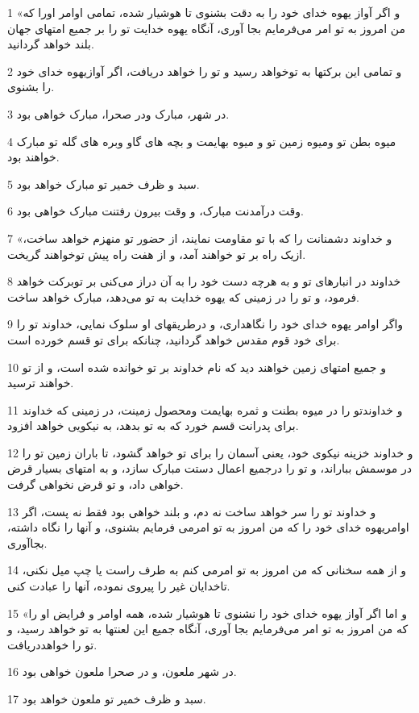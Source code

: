 \par 1 «و اگر آواز یهوه خدای خود را به دقت بشنوی تا هوشیار شده، تمامی اوامر اورا که من امروز به تو امر می‌فرمایم بجا آوری، آنگاه یهوه خدایت تو را بر جمیع امتهای جهان بلند خواهد گردانید.
\par 2 و تمامی این برکتها به توخواهد رسید و تو را خواهد دریافت، اگر آوازیهوه خدای خود را بشنوی.
\par 3 در شهر، مبارک ودر صحرا، مبارک خواهی بود.
\par 4 میوه بطن تو ومیوه زمین تو و میوه بهایمت و بچه های گاو وبره های گله تو مبارک خواهند بود.
\par 5 سبد و ظرف خمیر تو مبارک خواهد بود.
\par 6 وقت درآمدنت مبارک، و وقت بیرون رفتنت مبارک خواهی بود.
\par 7 «و خداوند دشمنانت را که با تو مقاومت نمایند، از حضور تو منهزم خواهد ساخت، ازیک راه بر تو خواهند آمد، و از هفت راه پیش توخواهند گریخت.
\par 8 خداوند در انبارهای تو و به هر‌چه دست خود را به آن دراز می‌کنی بر توبرکت خواهد فرمود، و تو را در زمینی که یهوه خدایت به تو می‌دهد، مبارک خواهد ساخت.
\par 9 واگر اوامر یهوه خدای خود را نگاهداری، و درطریقهای او سلوک نمایی، خداوند تو را برای خود قوم مقدس خواهد گردانید، چنانکه برای تو قسم خورده است.
\par 10 و جمیع امتهای زمین خواهند دید که نام خداوند بر تو خوانده شده است، و از تو خواهند ترسید.
\par 11 و خداوندتو را در میوه بطنت و ثمره بهایمت ومحصول زمینت، در زمینی که خداوند برای پدرانت قسم خورد که به تو بدهد، به نیکویی خواهد افزود.
\par 12 و خداوند خزینه نیکوی خود، یعنی آسمان را برای تو خواهد گشود، تا باران زمین تو را در موسمش بباراند، و تو را درجمیع اعمال دستت مبارک سازد، و به امتهای بسیار قرض خواهی داد، و تو قرض نخواهی گرفت.
\par 13 و خداوند تو را سر خواهد ساخت نه دم، و بلند خواهی بود فقط نه پست، اگر اوامریهوه خدای خود را که من امروز به تو امرمی فرمایم بشنوی، و آنها را نگاه داشته، بجاآوری.
\par 14 و از همه سخنانی که من امروز به تو امرمی کنم به طرف راست یا چپ میل نکنی، تاخدایان غیر را پیروی نموده، آنها را عبادت کنی.
\par 15 «و اما اگر آواز یهوه خدای خود را نشنوی تا هوشیار شده، همه اوامر و فرایض او را که من امروز به تو امر می‌فرمایم بجا آوری، آنگاه جمیع این لعنتها به تو خواهد رسید، و تو را خواهددریافت.
\par 16 در شهر ملعون، و در صحرا ملعون خواهی بود.
\par 17 سبد و ظرف خمیر تو ملعون خواهد بود.

